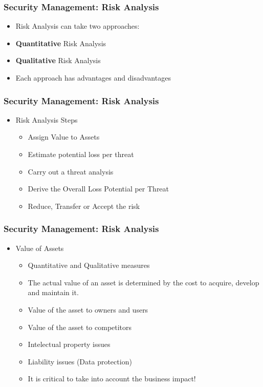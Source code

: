\documentclass{beamer}
\begin{document}

\begin{frame}
\frametitle{Security Management: Risk Analysis}
\begin{itemize}
\item Risk Analysis can take two approaches:
\item {\bf Quantitative} Risk Analysis 
\item {\bf Qualitative} Risk Analysis 
\item Each approach has advantages and disadvantages
\end{itemize}
\end{frame}



\begin{frame}
\frametitle{Security Management: Risk Analysis}
\begin{itemize}

\item Risk Analysis Steps
  \begin{itemize}
  \item Assign Value to Assets
  \item Estimate potential loss per threat
  \item Carry out a threat analysis
  \item Derive the Overall Loss Potential per Threat
  \item Reduce, Transfer or Accept the risk
  \end{itemize}
\end{itemize}
\end{frame}




\begin{frame}
\frametitle{Security Management: Risk Analysis}
\begin{itemize}

\item Value of Assets
  \begin{itemize}
  \item Quantitative and Qualitative measures 
  \item The actual value of an asset is determined by the cost to acquire, develop and maintain it.
  \item Value of the asset to owners and users
  \item Value of the asset to competitors
  \item Intelectual property issues
  \item Liability issues (Data protection)
  \item It is critical to take into account the business impact!
  \end{itemize}
\end{itemize}
\end{frame}
\end{document}

